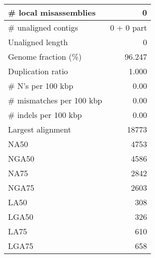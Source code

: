 \documentclass[12pt,a4paper]{article}
\begin{document}
\begin{table}[ht]
\begin{center}
\begin{tabular}{|l*{1}{|r}|}
\# local misassemblies & 0 \\ \hline
\# unaligned contigs & 0 + 0 part \\ \hline
Unaligned length & 0 \\ \hline
Genome fraction (\%) & 96.247 \\ \hline
Duplication ratio & 1.000 \\ \hline
\# N's per 100 kbp & 0.00 \\ \hline
\# mismatches per 100 kbp & 0.00 \\ \hline
\# indels per 100 kbp & 0.00 \\ \hline
Largest alignment & 18773 \\ \hline
NA50 & 4753 \\ \hline
NGA50 & 4586 \\ \hline
NA75 & 2842 \\ \hline
NGA75 & 2603 \\ \hline
LA50 & 308 \\ \hline
LGA50 & 326 \\ \hline
LA75 & 610 \\ \hline
LGA75 & 658 \\ \hline
\end{tabular}
\end{center}
\end{table}
\end{document}
